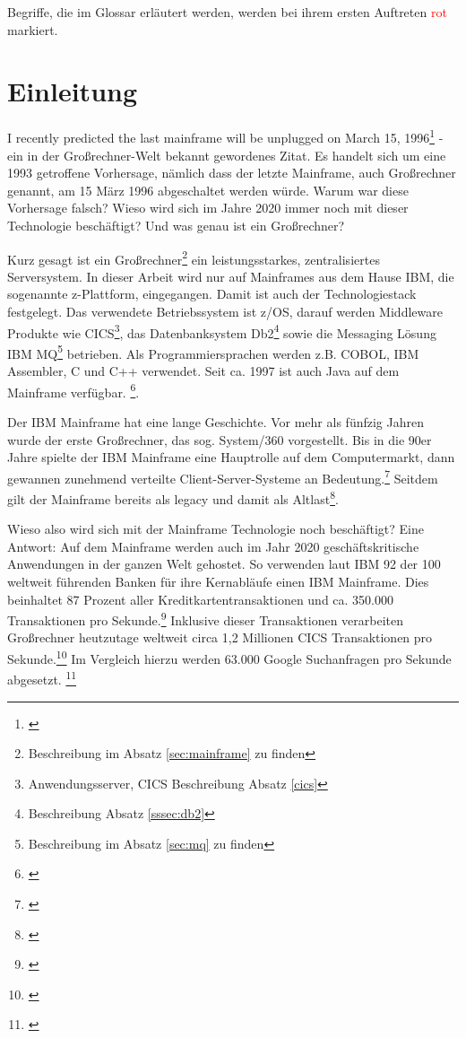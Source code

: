 Begriffe, die im Glossar erläutert werden, werden bei ihrem ersten Auftreten \textcolor{red}{rot} markiert.

\chapter{Einleitung}\label{ch:einleitung}
\glqq I recently predicted the last mainframe will be unplugged on March 15, 1996\grqq\footnote{\cite[S. 4]{Alsop.1993}} - ein in der Großrechner-Welt bekannt gewordenes Zitat.
Es handelt sich um eine 1993 getroffene Vorhersage, nämlich dass der letzte Mainframe, auch Großrechner genannt, am 15 März 1996 abgeschaltet werden würde.
Warum war diese Vorhersage falsch? 
Wieso wird sich im Jahre 2020 immer noch mit dieser Technologie beschäftigt? 
Und was genau ist ein Großrechner?

Kurz gesagt ist ein Großrechner\footnote{Beschreibung im Absatz \ref{sec:mainframe} zu finden} ein leistungsstarkes, zentralisiertes Serversystem.
In dieser Arbeit wird nur auf Mainframes aus dem Hause IBM, die sogenannte z-Plattform, eingegangen.
Damit ist auch der Technologiestack festgelegt.
Das verwendete Betriebssystem ist z/OS, darauf werden Middleware Produkte wie CICS\footnote{Anwendungsserver, CICS Beschreibung Absatz \ref{cics}}, das Datenbanksystem Db2\footnote{ Beschreibung Absatz \ref{sssec:db2}} sowie die Messaging Lösung \glqq IBM MQ\grqq{}\footnote{Beschreibung im Absatz \ref{sec:mq} zu finden} betrieben.
Als Programmiersprachen werden z.B. COBOL, IBM Assembler, C und C++ verwendet. 
Seit ca. 1997 ist auch Java auf dem Mainframe verfügbar. \footnote{\cite[S. 6]{Steegmans.2003}}.

Der IBM Mainframe hat eine lange Geschichte.
Vor mehr als fünfzig Jahren wurde der erste Großrechner, das sog. \glqq System/360\grqq{} vorgestellt.
Bis in die 90er Jahre spielte der IBM Mainframe eine Hauptrolle auf dem Computermarkt, dann gewannen zunehmend verteilte Client-Server-Systeme an Bedeutung.\footnote{\cite[Kap. 5]{Ceruzzi.2003}}
Seitdem gilt der Mainframe bereits als \glqq  legacy\grqq{} und damit als \glqq Altlast\grqq\footnote{\cite{.22.2.2020}}.

Wieso also wird sich mit der Mainframe Technologie noch beschäftigt? Eine Antwort: Auf dem Mainframe werden auch im Jahr 2020 geschäftskritische Anwendungen in der ganzen Welt gehostet.
So verwenden laut IBM 92 der 100 weltweit führenden Banken für ihre Kernabläufe einen IBM Mainframe.
Dies beinhaltet 87 Prozent aller Kreditkartentransaktionen und ca. 350.000 Transaktionen pro Sekunde.\footnote{\cite{.25.2.2020c}}
Inklusive dieser Transaktionen verarbeiten Großrechner heutzutage weltweit circa 1,2 Millionen CICS Transaktionen pro Sekunde.\footnote{\cite{.23.11.2019b}}
Im Vergleich hierzu werden 63.000 Google Suchanfragen pro Sekunde abgesetzt.  \footnote{\cite{.02.12.2019}}

